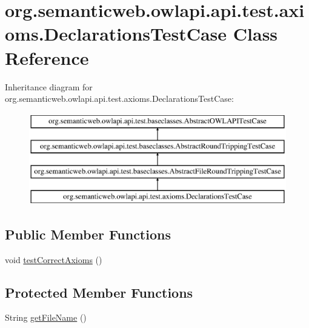 \hypertarget{classorg_1_1semanticweb_1_1owlapi_1_1api_1_1test_1_1axioms_1_1_declarations_test_case}{\section{org.\-semanticweb.\-owlapi.\-api.\-test.\-axioms.\-Declarations\-Test\-Case Class Reference}
\label{classorg_1_1semanticweb_1_1owlapi_1_1api_1_1test_1_1axioms_1_1_declarations_test_case}
}
Inheritance diagram for org.\-semanticweb.\-owlapi.\-api.\-test.\-axioms.\-Declarations\-Test\-Case\-:\begin{figure}[H]
\begin{center}
\leavevmode
\includegraphics[height=4.000000cm]{classorg_1_1semanticweb_1_1owlapi_1_1api_1_1test_1_1axioms_1_1_declarations_test_case}
\end{center}
\end{figure}
\subsection*{Public Member Functions}
\begin{DoxyCompactItemize}
\item 
void \hyperlink{classorg_1_1semanticweb_1_1owlapi_1_1api_1_1test_1_1axioms_1_1_declarations_test_case_ac5092c2fcfb2a89d2760aed363762ae2}{test\-Correct\-Axioms} ()
\end{DoxyCompactItemize}
\subsection*{Protected Member Functions}
\begin{DoxyCompactItemize}
\item 
String \hyperlink{classorg_1_1semanticweb_1_1owlapi_1_1api_1_1test_1_1axioms_1_1_declarations_test_case_ab148ca907861137547195350b94cfed1}{get\-File\-Name} ()
\end{DoxyCompactItemize}


